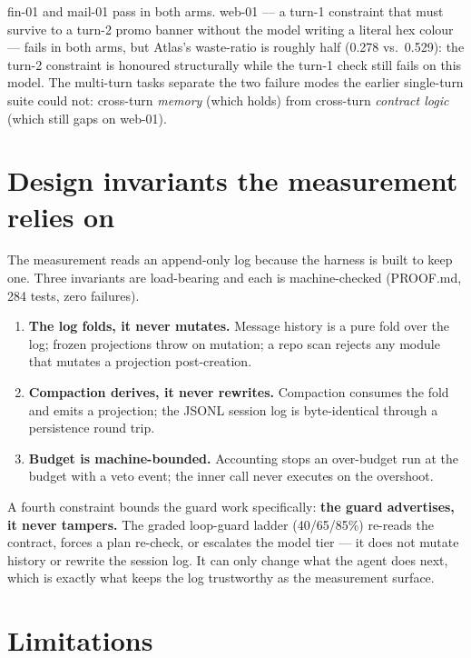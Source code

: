 \documentclass[11pt]{article}
\begin{document}
fin-01 and mail-01 pass in both arms. web-01 --- a turn-1 constraint that must survive to a turn-2 promo banner without the model writing a literal hex colour --- fails in both arms, but Atlas's waste-ratio is roughly half (0.278 vs.\ 0.529): the turn-2 constraint is honoured structurally while the turn-1 check still fails on this model. The multi-turn tasks separate the two failure modes the earlier single-turn suite could not: cross-turn \emph{memory} (which holds) from cross-turn \emph{contract logic} (which still gaps on web-01).

\section{Design invariants the measurement relies on}
\label{sec:invariants}

The measurement reads an append-only log because the harness is built to keep one. Three invariants are load-bearing and each is machine-checked (PROOF.md, 284 tests, zero failures).

\begin{enumerate}
\item \textbf{The log folds, it never mutates.} Message history is a pure fold over the log; frozen projections throw on mutation; a repo scan rejects any module that mutates a projection post-creation.
\item \textbf{Compaction derives, it never rewrites.} Compaction consumes the fold and emits a projection; the JSONL session log is byte-identical through a persistence round trip.
\item \textbf{Budget is machine-bounded.} Accounting stops an over-budget run at the budget with a veto event; the inner call never executes on the overshoot.
\end{enumerate}

A fourth constraint bounds the guard work specifically: \textbf{the guard advertises, it never tampers.} The graded loop-guard ladder (40/65/85\%) re-reads the contract, forces a plan re-check, or escalates the model tier --- it does not mutate history or rewrite the session log. It can only change what the agent does next, which is exactly what keeps the log trustworthy as the measurement surface.

\section{Limitations}
\label{sec:limitations}
\end{document}
